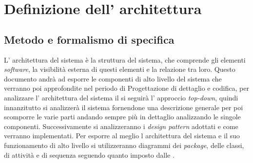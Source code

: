 \section{Definizione dell' architettura}
\subsection{Metodo e formalismo di specifica}
L' architettura del sistema è la struttura del sistema, che comprende gli elementi \textit{software}, la visibilità esterna di questi elementi e la relazione tra loro.
Questo documento andrà ad esporre le componenti di alto livello del sistema che verranno poi approfondite nel periodo di Progettazione di dettaglio e codifica, per analizzare l' architettura del sistema il \progetto  si seguirà l' approccio \textit{top-down}, quindi innanzitutto si analizzerà il sistema fornendone una descrizione generale per poi scomporre le varie parti andando sempre più in dettaglio analizzando le singole componenti.
Successivamente si analizzeranno i \textit{design pattern} adottati e come verranno implementati.
Per esporre al meglio l architettura del sistema e il suo funzionamento di alto livello si utilizzeranno diagrammi dei \textit{package}, delle classi, di attività e di sequenza seguendo quanto imposto dalle \NormeDiProgetto{}.
